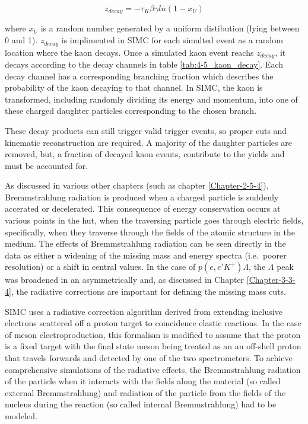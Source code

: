 \documentclass[
]{report}
\begin{document}
\begin{equation} 
  z_{decay}=-\tau_K\beta\gamma ln(1-x_U)
  \label{eq:z_decay} 
\end{equation}

\noindent where \(x_U\) is a random number generated by a uniform
distibution (lying between 0 and 1). \(z_{decay}\) is implimented in
SIMC for each simulted event as a random location where the kaon decays.
Once a simulated kaon event reachs \(z_{decay}\), it decays according to
the decay channels in table \ref{tab:4-5_kaon_decay}. Each decay channel
has a corresponding branching fraction which describes the probability
of the kaon decaying to that channel. In SIMC, the kaon is transformed,
including randomly dividing its energy and momentum, into one of these
charged daughter particles corresponding to the chosen branch.

These decay products can still trigger valid trigger events, so proper
cuts and kinematic reconstruction are required. A majority of the
daughter particles are removed, but, a fraction of decayed kaon events,
contribute to the yields and must be accounted for.

\label{Chapter-4-5}

As discussed in various other chapters (such as chapter
\ref{Chapter-2-5-4}), Bremmstrahlung radiation is produced when a
charged particle is suddenly accerated or decelerated. This consequence
of energy conservation occurs at various points in the hut, when the
traversing particle goes through electric fields, specifically, when
they traverse through the fields of the atomic structure in the medium.
The effects of Bremmstrahlung radiation can be seen directly in the data
as either a widening of the missing mass and energy spectra (i.e.~poorer
resolution) or a shift in central values. In the case of
\(p(e,e'K^+)\Lambda\), the \(\Lambda\) peak was broadened in an
asymmetrically and, as discussed in Chapter \ref{Chapter-3-3-4}, the
radiative corrections are important for defining the missing mass cuts.

SIMC uses a radiative correction algorithm derived from extending
inclusive electrons scattered off a proton target to coincidence elastic
reactions. In the case of meson electroproduction, this formalism is
modified to assume that the proton is a fixed target with the final
state meson being treated as an an off-shell proton that travels
forwards and detected by one of the two spectrometers. To achieve
comprehensive simulations of the radiative effects, the Bremmstrahlung
radiation of the particle when it interacts with the fields along the
material (so called external Bremmstrahlung) and radiation of the
particle from the fields of the nucleus during the reaction (so called
internal Bremmstrahlung) had to be modeled.
\end{document}
